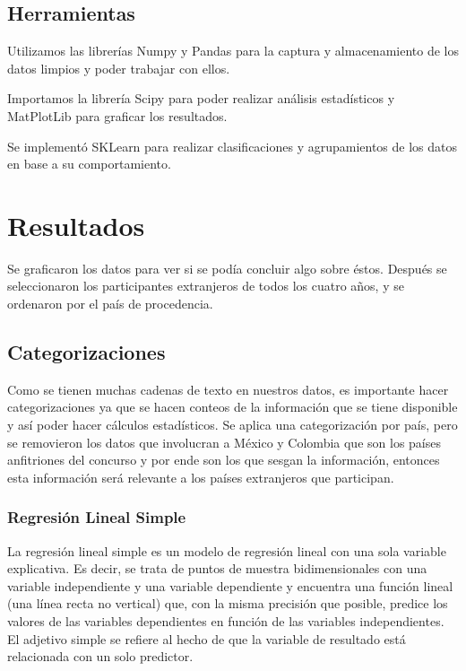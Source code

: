 \documentclass[5p,times]{elsarticle}
\begin{document}
\subsection*{Herramientas}
Utilizamos las librerías Numpy \cite{numpy} y Pandas \cite{pandas} para la captura y almacenamiento de los datos limpios y poder trabajar con ellos.

Importamos la librería Scipy \cite{scipy} para poder realizar análisis estadísticos y MatPlotLib \cite{matplotlib} para graficar los resultados.

Se implementó SKLearn \cite{sklearn} para realizar clasificaciones y agrupamientos de los datos en base a su comportamiento.


\section*{Resultados}
Se graficaron los datos para ver si se podía concluir algo sobre éstos. Después se seleccionaron los participantes extranjeros de todos los cuatro años, y se ordenaron por el país de procedencia.

\subsection*{Categorizaciones}

Como se tienen muchas cadenas de texto en nuestros datos, es importante hacer categorizaciones ya que se hacen conteos de la información que se tiene disponible y así poder hacer cálculos estadísticos. Se aplica una categorización por país, pero se removieron los datos que involucran a México y Colombia que son los países anfitriones del concurso y por ende son los que sesgan la información, entonces esta información será relevante a los países extranjeros que participan. 


\subsubsection*{Regresión Lineal Simple}
La regresión lineal simple es un modelo de regresión lineal con una sola variable explicativa. Es decir, se trata de puntos de muestra bidimensionales con una variable independiente y una variable dependiente y encuentra una función lineal (una línea recta no vertical) que, con la misma precisión que posible, predice los valores de las variables dependientes en función de las variables independientes. El adjetivo simple se refiere al hecho de que la variable de resultado está relacionada con un solo predictor.
\end{document}
